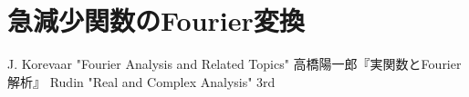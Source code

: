 \documentclass[uplatex,dvipdfmx]{jsreport}
\begin{document}
\section{急減少関数のFourier変換}

\begin{thebibliography}{9}
    J. Korevaar "Fourier Analysis and Related Topics"
    高橋陽一郎『実関数とFourier解析』
    Rudin "Real and Complex Analysis" 3rd
\end{thebibliography}
\end{document}

